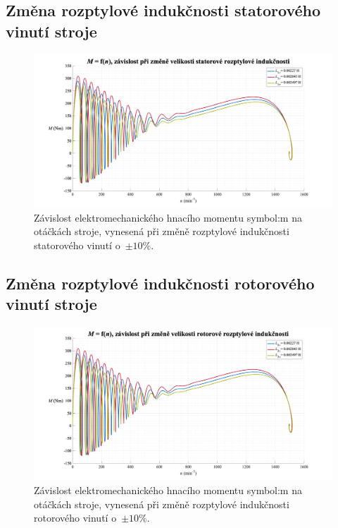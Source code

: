 \documentclass[a4paper, twoside, 11pt]{article}
\newcommand{\fbar}{\FloatBarrier}
\begin{document}
    \fbar
    \subsection{Změna rozptylové indukčnosti statorového vinutí stroje}
        \begin{figure}[htbp!]
            \centering
            \includegraphics[width=1\textwidth]{src/png/mh_dyn_nGraphL1sigma.png}
            \caption{Závislost elektromechanického hnacího momentu \gls{symbol:m} na otáčkách stroje, vynesená při změně rozptylové indukčnosti statorového vinutí o~$\pm 10 \%$.}
            \label{fig:mh_dyn_nGraphL1sigma}
        \end{figure}

    \newpage
    \fbar
    \subsection{Změna rozptylové indukčnosti rotorového vinutí stroje}
        \begin{figure}[htbp!]
            \centering
            \includegraphics[width=1\textwidth]{src/png/mh_dyn_nGraphL2sigma.png}
            \caption{Závislost elektromechanického hnacího momentu \gls{symbol:m} na otáčkách stroje, vynesená při změně rozptylové indukčnosti rotorového vinutí o~$\pm 10 \%$.}
            \label{fig:mh_dyn_nGraphL2sigma}
        \end{figure}
\end{document}
